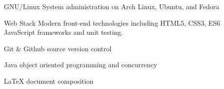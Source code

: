 

\begin{cvskills}

  \cvskill
    {GNU/Linux} %
    {System administration on Arch Linux, Ubuntu, and Fedora} %

  \cvskill
    {Web Stack} %
    {Modern front-end technologies including HTML5, CSS3, ES6 JavaScript frameworks and unit testing.} %

  \cvskill
    {Git \& Github} %
    {source version control} %

  \cvskill
    {Java} %
    {object oriented programming and concurrency} %

  \cvskill
    {LaTeX} %
    {document composition} %

\end{cvskills}
